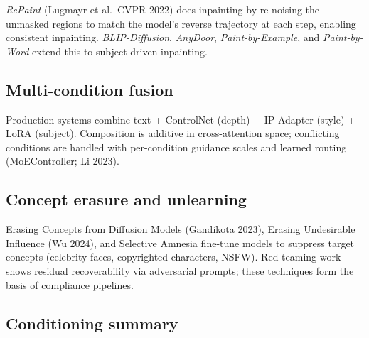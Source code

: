 \emph{RePaint} (Lugmayr et al.~CVPR 2022) does inpainting by re-noising the unmasked regions to match the model's reverse trajectory at each step, enabling consistent inpainting. \emph{BLIP-Diffusion}, \emph{AnyDoor}, \emph{Paint-by-Example}, and \emph{Paint-by-Word} extend this to subject-driven inpainting.

\subsection{Multi-condition fusion}\label{multi-condition-fusion}

Production systems combine text + ControlNet (depth) + IP-Adapter (style) + LoRA (subject). Composition is additive in cross-attention space; conflicting conditions are handled with per-condition guidance scales and learned routing (MoEController; Li 2023).

\subsection{Concept erasure and unlearning}\label{concept-erasure-and-unlearning}

Erasing Concepts from Diffusion Models (Gandikota 2023), Erasing Undesirable Influence (Wu 2024), and Selective Amnesia fine-tune models to suppress target concepts (celebrity faces, copyrighted characters, NSFW). Red-teaming work shows residual recoverability via adversarial prompts; these techniques form the basis of compliance pipelines.

\subsection{Conditioning summary}\label{conditioning-summary}


